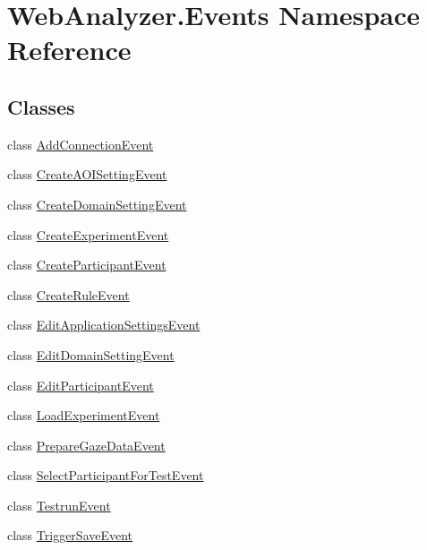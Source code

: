 \hypertarget{namespace_web_analyzer_1_1_events}{}\section{Web\+Analyzer.\+Events Namespace Reference}
\label{namespace_web_analyzer_1_1_events}
\subsection*{Classes}
\begin{DoxyCompactItemize}
\item 
class \hyperlink{class_web_analyzer_1_1_events_1_1_add_connection_event}{Add\+Connection\+Event}
\item 
class \hyperlink{class_web_analyzer_1_1_events_1_1_create_a_o_i_setting_event}{Create\+A\+O\+I\+Setting\+Event}
\item 
class \hyperlink{class_web_analyzer_1_1_events_1_1_create_domain_setting_event}{Create\+Domain\+Setting\+Event}
\item 
class \hyperlink{class_web_analyzer_1_1_events_1_1_create_experiment_event}{Create\+Experiment\+Event}
\item 
class \hyperlink{class_web_analyzer_1_1_events_1_1_create_participant_event}{Create\+Participant\+Event}
\item 
class \hyperlink{class_web_analyzer_1_1_events_1_1_create_rule_event}{Create\+Rule\+Event}
\item 
class \hyperlink{class_web_analyzer_1_1_events_1_1_edit_application_settings_event}{Edit\+Application\+Settings\+Event}
\item 
class \hyperlink{class_web_analyzer_1_1_events_1_1_edit_domain_setting_event}{Edit\+Domain\+Setting\+Event}
\item 
class \hyperlink{class_web_analyzer_1_1_events_1_1_edit_participant_event}{Edit\+Participant\+Event}
\item 
class \hyperlink{class_web_analyzer_1_1_events_1_1_load_experiment_event}{Load\+Experiment\+Event}
\item 
class \hyperlink{class_web_analyzer_1_1_events_1_1_prepare_gaze_data_event}{Prepare\+Gaze\+Data\+Event}
\item 
class \hyperlink{class_web_analyzer_1_1_events_1_1_select_participant_for_test_event}{Select\+Participant\+For\+Test\+Event}
\item 
class \hyperlink{class_web_analyzer_1_1_events_1_1_testrun_event}{Testrun\+Event}
\item 
class \hyperlink{class_web_analyzer_1_1_events_1_1_trigger_save_event}{Trigger\+Save\+Event}
\end{DoxyCompactItemize}

